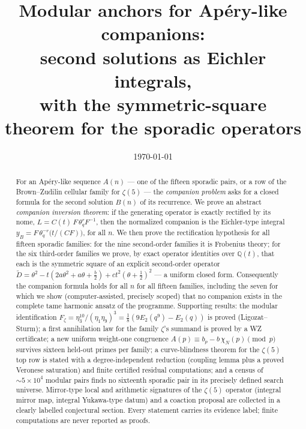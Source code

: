 \documentclass[11pt,reqno]{amsart}
\theoremstyle{plain}
\theoremstyle{definition}
\theoremstyle{remark}
\newcommand{\Q}{\mathbb{Q}}
\newcommand{\thq}{\theta_q}
\begin{document}
\title[Modular anchors for Ap\'ery-like companions]
      {Modular anchors for Ap\'ery-like companions:\\
       second solutions as Eichler integrals,\\
       with the symmetric-square theorem for the sporadic operators}

\author{}
\date{\today}

\begin{abstract}
For an Ap\'ery-like sequence $A(n)$ --- one of the fifteen sporadic pairs, or
a row of the Brown--Zudilin cellular family for $\zeta(5)$ --- the
\emph{companion problem} asks for a closed formula for the second solution
$B(n)$ of its recurrence. We prove an abstract \emph{companion inversion
theorem}: if the generating operator is exactly rectified by its nome,
$L=C(t)\,F\,\thq^{r}F^{-1}$, then the normalized companion is the
Eichler-type integral $y_B=F\,\thq^{-r}\bigl(t/(C F)\bigr)$, for all $n$.
We then prove the rectification hypothesis for all fifteen sporadic
families: for the nine second-order families it is Frobenius theory; for
the six third-order families we prove, by exact operator identities over
$\Q(t)$, that each is the symmetric square of an explicit second-order
operator $\widetilde D=\theta^2-t(2a\theta^2+a\theta+\tfrac b2)
+ct^2(\theta+\tfrac12)^2$ --- a uniform closed form. Consequently the
companion formula holds for all $n$ for all fifteen families, including the
seven for which we show (computer-assisted, precisely scoped) that no
companion exists in the complete tame harmonic ansatz of the programme.
Supporting results: the modular identification
$F_\zeta=\eta_3^{10}/(\eta_1\eta_9)^3=\tfrac18(9E_2(q^9)-E_2(q))$ is proved
(Ligozat--Sturm); a first annihilation law for the family $\zeta$'s summand
is proved by a WZ certificate; a new uniform weight-one congruence
$A(p)\equiv b_p-b\,\chi_N(p)\pmod p$ survives sixteen held-out primes per
family; a curve-blindness theorem for the $\zeta(5)$ top row is stated with
a degree-independent reduction (coupling lemma plus a proved Veronese
saturation) and finite certified residual computations; and a
census of $\sim5\times10^4$ modular pairs finds no sixteenth sporadic pair
in its precisely defined search universe. Mirror-type local and arithmetic
signatures of the $\zeta(5)$ operator (integral mirror map, integral
Yukawa-type datum) and a coaction proposal are collected in a clearly
labelled conjectural section. Every statement carries its evidence label;
finite computations are never reported as proofs.
\end{abstract}
\end{document}
